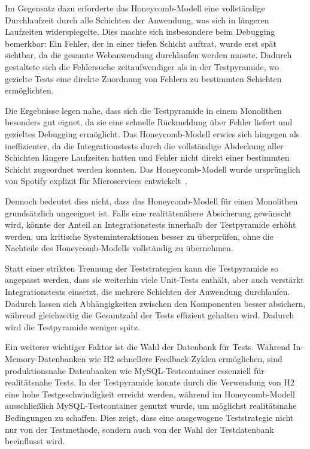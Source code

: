 Im Gegensatz dazu erforderte das Honeycomb-Modell eine vollständige Durchlaufzeit durch alle Schichten der Anwendung, was sich in längeren Laufzeiten widerspiegelte. Dies machte sich insbesondere beim Debugging bemerkbar: Ein Fehler, der in einer tiefen Schicht auftrat, wurde erst spät sichtbar, da die gesamte Webanwendung durchlaufen werden musste. Dadurch gestaltete sich die Fehlersuche zeitaufwendiger als in der Testpyramide, wo gezielte Tests eine direkte Zuordnung von Fehlern zu bestimmten Schichten ermöglichten.

Die Ergebnisse legen nahe, dass sich die Testpyramide in einem Monolithen besonders gut eignet, da sie eine schnelle Rückmeldung über Fehler liefert und gezieltes Debugging ermöglicht. Das Honeycomb-Modell erwies sich hingegen als ineffizienter, da die Integrationstests durch die vollständige Abdeckung aller Schichten längere Laufzeiten hatten und Fehler nicht direkt einer bestimmten Schicht zugeordnet werden konnten. Das Honeycomb-Modell wurde ursprünglich von Spotify explizit für Microservices entwickelt~\cite{Spotify18}. 

Dennoch bedeutet dies nicht, dass das Honeycomb-Modell für einen Monolithen grundsätzlich ungeeignet ist. Falls eine realitätsnähere Absicherung gewünscht wird, könnte der Anteil an Integrationstests innerhalb der Testpyramide erhöht werden, um kritische Systeminteraktionen besser zu überprüfen, ohne die Nachteile des Honeycomb-Modells vollständig zu übernehmen.

Statt einer strikten Trennung der Teststrategien kann die Testpyramide so angepasst werden, dass sie weiterhin viele Unit-Tests enthält, aber auch verstärkt Integrationstests einsetzt, die mehrere Schichten der Anwendung durchlaufen. Dadurch lassen sich Abhängigkeiten zwischen den Komponenten besser absichern, während gleichzeitig die Gesamtzahl der Tests effizient gehalten wird. Dadurch wird die Testpyramide weniger spitz.

Ein weiterer wichtiger Faktor ist die Wahl der Datenbank für Tests. Während In-Memory-Datenbanken wie H2 schnellere Feedback-Zyklen ermöglichen, sind produktionsnahe Datenbanken wie MySQL-Testcontainer essenziell für realitätsnahe Tests. In der Testpyramide konnte durch die Verwendung von H2 eine hohe Testgeschwindigkeit erreicht werden, während im Honeycomb-Modell ausschließlich MySQL-Testcontainer genutzt wurde, um möglichst realitätsnahe Bedingungen zu schaffen. Dies zeigt, dass eine ausgewogene Teststrategie nicht nur von der Testmethode, sondern auch von der Wahl der Testdatenbank beeinflusst wird.

